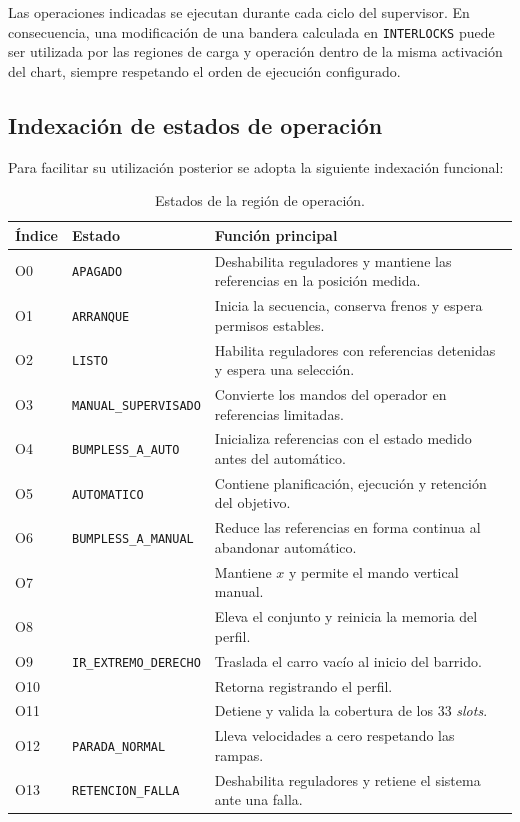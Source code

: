\documentclass[a4paper,10pt,onecolumn,journal]{ieeeconf}
\numberwithin{equation}{section}
\begin{document}
Las operaciones indicadas se ejecutan durante cada ciclo del supervisor. En consecuencia, una modificación de una bandera calculada en \texttt{INTERLOCKS} puede ser utilizada por las regiones de carga y operación dentro de la misma activación del chart, siempre respetando el orden de ejecución configurado.


\subsection{Indexación de estados de operación}
Para facilitar su utilización posterior se adopta la siguiente indexación funcional:
\begin{longtable}{C{1.2cm} L{4.4cm} L{8.2cm}}
\caption{Estados de la región de operación.}\\
\toprule
Índice & Estado & Función principal\\
\midrule
O0 & \texttt{APAGADO} & Deshabilita reguladores y mantiene las referencias en la posición medida.\\
O1 & \texttt{ARRANQUE} & Inicia la secuencia, conserva frenos y espera permisos estables.\\
O2 & \texttt{LISTO} & Habilita reguladores con referencias detenidas y espera una selección.\\
O3 & \texttt{MANUAL\_SUPERVISADO} & Convierte los mandos del operador en referencias limitadas.\\
O4 & \texttt{BUMPLESS\_A\_AUTO} & Inicializa referencias con el estado medido antes del automático.\\
O5 & \texttt{AUTOMATICO} & Contiene planificación, ejecución y retención del objetivo.\\
O6 & \texttt{BUMPLESS\_A\_MANUAL} & Reduce las referencias en forma continua al abandonar automático.\\
O7 &  & Mantiene $x$ y permite el mando vertical manual.\\
O8 &  & Eleva el conjunto y reinicia la memoria del perfil.\\
O9 & \texttt{IR\_EXTREMO\_DERECHO} & Traslada el carro vacío al inicio del barrido.\\
O10 &  & Retorna registrando el perfil.\\
O11 &  & Detiene y valida la cobertura de los 33 \textit{slots}.\\
O12 & \texttt{PARADA\_NORMAL} & Lleva velocidades a cero respetando las rampas.\\
O13 & \texttt{RETENCION\_FALLA} & Deshabilita reguladores y retiene el sistema ante una falla.\\
\bottomrule
\end{longtable}
\end{document}
